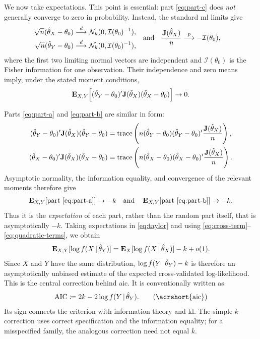 \documentclass[a4paper,12pt]{article}
\begin{document}
We now take expectations.
This point is essential: part \eqref{eq:part-c} does \emph{not} generally converge to zero in probability.
Instead, the standard \acrshort{ml} limits give
\begin{align*}
	\begin{aligned}
		\sqrt n(\hat\theta_X-\theta_0)&\overset{d}{\longrightarrow}
		\mathcal N_k(0,\mathcal I(\theta_0)^{-1}),\\
		\sqrt n(\hat\theta_Y-\theta_0)&\overset{d}{\longrightarrow}
		\mathcal N_k(0,\mathcal I(\theta_0)^{-1}),
	\end{aligned}
	\quad\text{and}\quad
	\frac{\mathbf{J}(\hat\theta_X)}{n}&\overset{p}{\longrightarrow}-\mathcal I(\theta_0),
\end{align*}
where the first two limiting normal vectors are independent and
$\mathcal I(\theta_0)$ is the Fisher information for one observation.
Their independence and zero means imply, under the stated moment conditions,
\begin{align}\label{eq:cross-term}
	\operatorname{\text{\textrm{\upshape\textbf{E}}}}_{X,Y}\!\left[
	(\hat\theta_{Y}-\theta_{0})^{\prime}
	\mathbf{J}(\hat\theta_{X})
	(\hat\theta_{X}-\theta_{0})
	\right]\to0.
\end{align}

Parts \eqref{eq:part-a} and \eqref{eq:part-b} are similar in form:
\begin{align*}
	(\hat\theta_{Y}-\theta_{0})^{\prime}
	\mathbf{J}(\hat\theta_{X})
	(\hat\theta_{Y}-\theta_{0})
	&=
	\operatorname{trace}\left(
	n(\hat\theta_{Y}-\theta_{0})(\hat\theta_{Y}-\theta_{0})^{\prime}
	\frac{\mathbf{J}(\hat\theta_{X})}{n}
	\right),\\
	(\hat\theta_{X}-\theta_{0})^{\prime}
	\mathbf{J}(\hat\theta_{X})
	(\hat\theta_{X}-\theta_{0})
	&=
	\operatorname{trace}\left(
	n(\hat\theta_{X}-\theta_{0})(\hat\theta_{X}-\theta_{0})^{\prime}
	\frac{\mathbf{J}(\hat\theta_{X})}{n}
	\right).
\end{align*}
Asymptotic normality, the information equality, and convergence of the relevant moments therefore give
\begin{align}\label{eq:quadratic-terms}
	\operatorname{\text{\textrm{\upshape\textbf{E}}}}_{X,Y}[\text{part \eqref{eq:part-a}}]\to-k
	\quad\text{and}\quad
	\operatorname{\text{\textrm{\upshape\textbf{E}}}}_{X,Y}[\text{part \eqref{eq:part-b}}]\to-k.
\end{align}
Thus it is the \emph{expectation} of each part, rather than the random part itself,
that is asymptotically $-k$.
Taking expectations in \eqref{eq:taylor} and using
\eqref{eq:cross-term}--\eqref{eq:quadratic-terms}, we obtain
\begin{align}\label{eq:expected-cv}
	\operatorname{\text{\textrm{\upshape\textbf{E}}}}_{X,Y}[\log f(X\,|\,\hat\theta_{Y})]
	=
	\operatorname{\text{\textrm{\upshape\textbf{E}}}}_X[\log f(X\,|\,\hat\theta_{X})]-k+o(1).
\end{align}
Since $X$ and $Y$ have the same distribution,
$\log f(Y\,|\,\hat\theta_Y)-k$ is therefore an asymptotically unbiased estimate
of the expected cross-validated log-likelihood.
This is the central correction behind \acrshort{aic}.
It is conventionally written as
\begin{align}
	\aic
	\coloneqq
	2k-2\log f(Y\given\hat\theta_{Y}). \label{eq:aic}\tag{\acrshort{aic}}
\end{align}
Its sign connects the criterion with information theory and \acrlong{kl}.
The simple $k$ correction uses correct specification and the information equality;
for a misspecified family, the analogous correction need not equal $k$.
\end{document}
